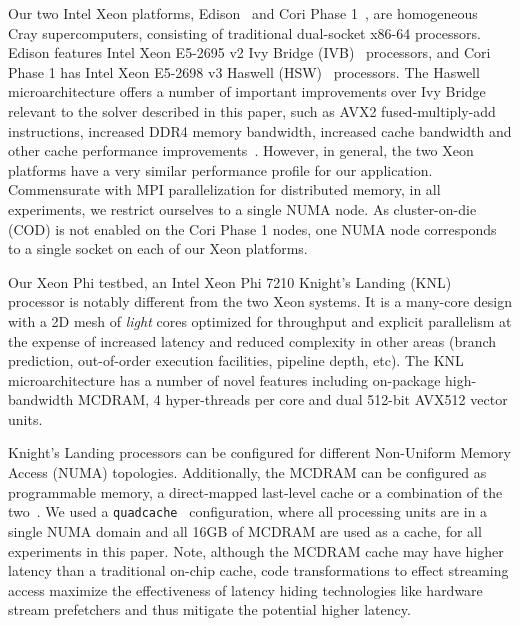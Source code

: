 \documentclass{sig-alternate-05-2015}
\begin{document}
Our two Intel Xeon platforms, Edison~\cite{edison_configuration} and Cori Phase
  1~\cite{cori_phase_1_configuration}, are homogeneous Cray supercomputers,
  consisting of traditional dual-socket x86-64 processors.
Edison features Intel Xeon E5-2695 v2 Ivy Bridge (IVB)~\cite{intel_ark_xeon_e5_2695_v2}
  processors, and Cori Phase 1 has Intel Xeon E5-2698
  v3 Haswell (HSW)~\cite{intel_ark_xeon_e5_2698_v3} processors.
The Haswell microarchitecture offers a number of important improvements over
  Ivy Bridge relevant to the solver described in this paper, such as AVX2
  fused-multiply-add instructions, increased DDR4 memory bandwidth, increased
  cache bandwidth and other cache performance improvements~\cite{intel_opt_manual}.
However, in general, the two Xeon platforms have a very similar performance
  profile for our application.
Commensurate with MPI parallelization for distributed memory, in all experiments, we restrict ourselves to a single NUMA node.
As cluster-on-die (COD) is not enabled on the Cori Phase 1 nodes, one NUMA node corresponds to a single socket on each of our Xeon platforms.

Our Xeon Phi testbed, an Intel Xeon Phi 7210 Knight's Landing (KNL)~\cite{intel_ark_xeon_phi_7210}
  processor is notably different from the two Xeon systems.
It is a many-core design with a 2D mesh of \emph{light} cores optimized
  for throughput and explicit parallelism at the expense of increased latency
  and reduced complexity in other areas (branch prediction, out-of-order
  execution facilities, pipeline depth, etc).
The KNL microarchitecture has a number of novel features including on-package
  high-bandwidth MCDRAM, 4 hyper-threads per core and dual 512-bit
  AVX512 vector units.~\cite{roofline_knl,sodani_slides}

Knight's Landing processors can be configured for different Non-Uniform Memory
  Access (NUMA) topologies.
Additionally, the MCDRAM can be configured as programmable memory, a
  direct-mapped last-level cache or a combination of the
  two~\cite{sodani_slides}.
We used a \lstinline{quadcache}~\cite{roofline_knl} configuration, where all
  processing units are in a single NUMA domain and all 16GB of MCDRAM are used
  as a cache, for all experiments in this paper.  Note, although the MCDRAM cache may have higher latency than a traditional on-chip cache, code transformations to effect streaming access maximize the effectiveness of latency hiding technologies like hardware stream prefetchers and thus mitigate the potential higher latency.
\end{document}
